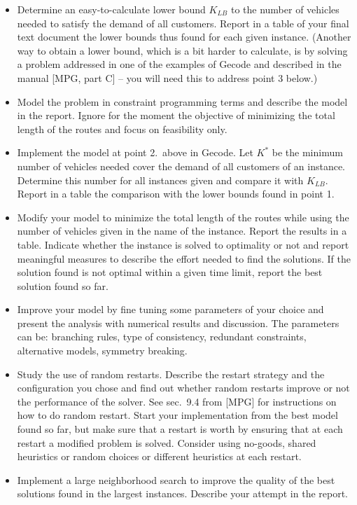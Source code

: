 \begin{itemize}

\item Determine an easy-to-calculate lower bound $K_{LB}$ to the number
  of vehicles needed to satisfy the demand of all customers. Report in a
  table of your final text document the lower bounds thus found for each
  given instance. (Another way to obtain a lower bound, which is a bit
  harder to calculate, is by solving a problem addressed in one of the
  examples of Gecode and described in the manual [MPG, part C] --
  \color{blue}you will need this to address point 3 below.\color{black})

\item Model the problem in constraint programming terms and describe the
  model in the report. \color{black} Ignore for the moment the objective
  of minimizing the total length of the routes and focus on feasibility
  only.\color{black}


\item Implement the model at point 2.~above in Gecode. Let $K^*$ be the
  minimum number of vehicles needed cover the demand of all customers of
  an instance. Determine this number for all instances given and compare
  it with $K_{LB}$. Report in a table the comparison with the lower
  bounds found in point 1.

\item Modify your model to minimize the total length of the routes while
  using the number of vehicles given in the name of the instance. Report
  the results in a table. Indicate whether the instance is solved to
  optimality or not and report meaningful measures to describe the
  effort needed to find the solutions. If the solution found is not
  optimal within a given time limit, report the best solution found so
  far.
  
\item Improve your model by fine tuning some parameters of your choice
  and present the analysis with numerical results and discussion. The
  parameters can be: branching rules, type of consistency, redundant
  constraints, alternative models, symmetry breaking.

\item Study the use of random restarts. Describe the restart strategy and
  the configuration you chose and find out whether random restarts
  improve or not the performance of the solver. See sec.~9.4 from [MPG]
  for instructions on how to do random restart. Start your
  implementation from the best model found so far, but make sure that a
  restart is worth by ensuring that at each restart a modified problem
  is solved. Consider using no-goods, shared heuristics or random
  choices or different heuristics at each restart.
  
\item Implement a large neighborhood search to improve the quality of
  the best solutions found in the largest instances. Describe your
  attempt in the report.
\end{itemize}


